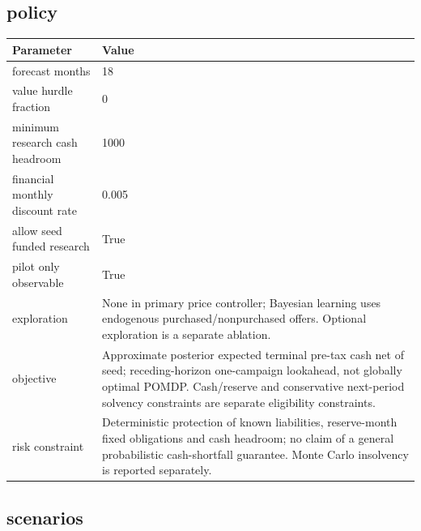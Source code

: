 \documentclass[10pt]{article}
\begin{document}
\subsection*{policy}

\begin{longtable}{p{.44\linewidth}p{.50\linewidth}}\toprule Parameter & Value \\\midrule\endhead

forecast months & 18\\

value hurdle fraction & 0\\

minimum research cash headroom & 1000\\

financial monthly discount rate & 0.005\\

allow seed funded research & True\\

pilot only observable & True\\

exploration & None in primary price controller; Bayesian learning uses endogenous purchased/nonpurchased offers. Optional exploration is a separate ablation.\\

objective & Approximate posterior expected terminal pre-tax cash net of seed; receding-horizon one-campaign lookahead, not globally optimal POMDP. Cash/reserve and conservative next-period solvency constraints are separate eligibility constraints.\\

risk constraint & Deterministic protection of known liabilities, reserve-month fixed obligations and cash headroom; no claim of a general probabilistic cash-shortfall guarantee. Monte Carlo insolvency is reported separately.\\

\bottomrule\end{longtable}

\subsection*{scenarios}
\end{document}
